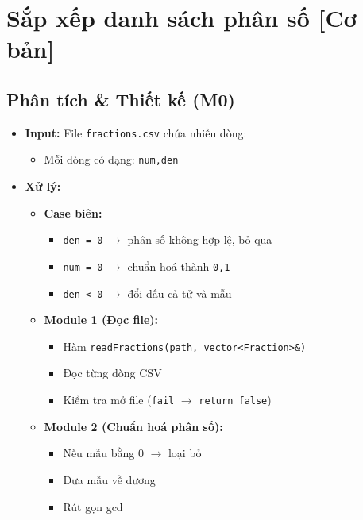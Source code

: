 \section{Sắp xếp danh sách phân số [Cơ bản]}
\subsection{Phân tích \& Thiết kế (M0)}
\begin{itemize}
    \item \textbf{Input:}
    File \texttt{fractions.csv} chứa nhiều dòng:
    \begin{itemize}
        \item Mỗi dòng có dạng: \texttt{num,den}
    \end{itemize}

    \item \textbf{Xử lý:}
    \begin{itemize}
        \item \textbf{Case biên:}
        \begin{itemize}
            \item \texttt{den = 0} $\rightarrow$ phân số không hợp lệ, bỏ qua
            \item \texttt{num = 0} $\rightarrow$ chuẩn hoá thành \texttt{0,1}
            \item \texttt{den < 0} $\rightarrow$ đổi dấu cả tử và mẫu
        \end{itemize}

        \item \textbf{Module 1 (Đọc file):}
        \begin{itemize}
            \item Hàm \texttt{readFractions(path, vector<Fraction>\&)}
            \item Đọc từng dòng CSV
            \item Kiểm tra mở file (\texttt{fail} $\rightarrow$ \texttt{return false})
        \end{itemize}

        \item \textbf{Module 2 (Chuẩn hoá phân số):}
        \begin{itemize}
            \item Nếu mẫu bằng 0 $\rightarrow$ loại bỏ
            \item Đưa mẫu về dương
            \item Rút gọn gcd
        \end{itemize}


\end{itemize}
\end{itemize}
